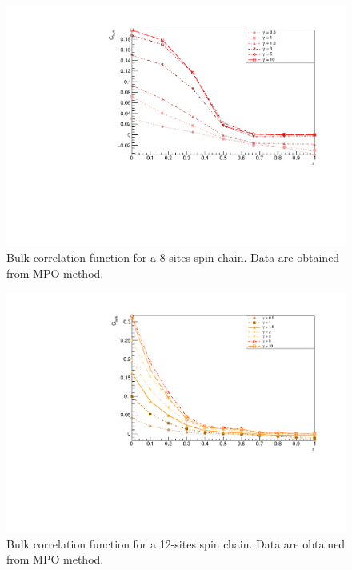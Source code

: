 \begin{figure}[H]
    \centering
    \includegraphics[scale=0.7]{Figures/8sites_CBulkConnVSgamma.pdf}
    \caption{Bulk correlation function for a 8-sites spin chain. Data are obtained from MPO method.}
    \label{fig:8sites_CBulkConnVSgamma}
\end{figure}

\begin{figure}[H]
    \centering
    \includegraphics[scale=0.7]{Figures/12sites/12sites_CFBulkCONNVSgamma.pdf}
    \caption{Bulk correlation function for a 12-sites spin chain. Data are obtained from MPO method.}
    \label{fig:12sites_CFBulkCONNVSgamma}
\end{figure}

